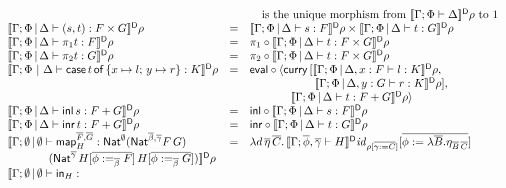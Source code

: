 \documentclass{lmcs}
\theoremstyle{plain}\newtheorem{satz}[thm]{Satz}
\newcommand{\inl}{\mathsf{inl}}
\newcommand{\inr}{\mathsf{inr}}
\renewcommand{\id}{\mathit{id}}
\newcommand{\map}{\mathsf{map}}
\begin{document}
\begin{figure*}
{\begin{minipage}[t]{0.5\textwidth}
\[\begin{array}{lll}
& & \hspace*{0.1in} \mbox{ is the unique morphism from }
\dsem{\Gamma;\Phi\vdash \Delta}\rho \mbox{ to } 1\\ 
\dsem{\Gamma;\Phi \,|\, \Delta \vdash (s,t) : F \times G} \rho& = &
\dsem{\Gamma;\Phi \,|\, \Delta \vdash s: F} \rho\times
\dsem{\Gamma;\Phi \,|\, \Delta \vdash t : G} \rho\\
\dsem{\Gamma;\Phi \,|\, \Delta \vdash \pi_1 t : F} \rho& = &
\pi_1 \circ \dsem{\Gamma;\Phi \,|\, \Delta \vdash t : F \times G}\rho\\
\dsem{\Gamma;\Phi \,|\, \Delta \vdash \pi_2 t : G}\rho & = &
\pi_2 \circ \dsem{\Gamma;\Phi \,|\, \Delta \vdash t : F \times
  G} \rho\\
\dsem{\Gamma;\Phi~|~\Delta \vdash \cse{t}{x \mapsto l}{y \mapsto r} :
  K}\rho & = & \eval \circ \langle \curry \,[\dsem{\Gamma;\Phi
    \,|\, \Delta, x : F \vdash l : K}\rho,\\
   & & \hspace*{0.79in} \dsem{\Gamma;\Phi \,|\, \Delta, y
    : G \vdash r : K}\rho],\\
   & &  \hspace*{0.5in} \dsem{\Gamma;\Phi \,|\, \Delta \vdash t :
  F + G} \rho\rangle\\   
\dsem{\Gamma;\Phi \,|\, \Delta \vdash \inl \,s: F + G} \rho& = &
\inl \circ \dsem{\Gamma;\Phi \,|\, \Delta \vdash s: F}\rho\\
\dsem{\Gamma;\Phi \,|\, \Delta \vdash \inr \,t: F + G}\rho & = & 
\inr \circ \dsem{\Gamma;\Phi \,|\, \Delta \vdash t : G}\rho\\
\llbracket \Gamma;\emptyset \,|\, \emptyset \vdash \map^{\ol{F},\ol{G}}_H
  : \Nat^\emptyset (\Nat^{\ol\beta,\ol\gamma} F\,G)
& = & \lambda d\, \ol\eta\,\ol{C}.\,
\dsem{\Gamma; \ol{\phi},\ol{\gamma}\vdash H}\id_{\rho[\ol{\gamma:=
      C}]}[\ol{\phi := \lambda \ol B. \eta_{\ol B\, \ol C}}]\\ 
\hspace*{0.5in}
  (\Nat^{\ol{\gamma}}\,H[\ol{\phi :=_{\ol{\beta}} F}]\,H[\ol{\phi
      :=_{\ol{\beta}} G}]) \rrbracket^{\mathsf D} \rho & &\\
\llbracket \Gamma;\emptyset \,|\, \emptyset \vdash \tin_H :

\end{array}\]
\end{minipage}}
\end{figure*}
\end{document}
